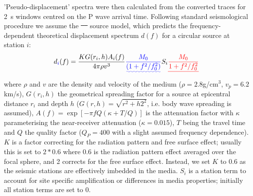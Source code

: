 \documentclass[reviewcopy]{elsart}
\providecommand{\DIFadd}[1]{{\protect\color{blue}\uwave{#1}}} %
\providecommand{\DIFdel}[1]{{\protect\color{red}\sout{#1}}}                      %
\providecommand{\DIFaddbegin}{} %
\providecommand{\DIFaddend}{} %
\providecommand{\DIFdelbegin}{} %
\providecommand{\DIFdelend}{} %
\begin{document}
'Pseudo-displacement' spectra were then calculated from the converted traces for 2~s windows
centred on the P wave arrival time.  Following standard seismological
procedure we assume the \DIFdelbegin \DIFdel{\mbox{%
\citep{brune70} }%
}\DIFdelend \DIFaddbegin \DIFadd{\mbox{%
\citet{brune70} }%
}\DIFaddend source model, which predicts
the frequency-dependent theoretical displacement spectrum $d(f)$ for a circular source at
station $i$:
\begin{equation}
d\DIFaddbegin \DIFadd{_i}\DIFaddend (f)=\frac{K G(r_i,h) A_i(f)}{4 \pi \rho v^3} \DIFaddbegin \DIFadd{\frac{M_0}{(1+f^2/f_0^2)}  }\DIFaddend S_i
\DIFdelbegin \DIFdel{\frac{M_0}{1+f^2/f_0^2} 
}\DIFdelend \end{equation}
where $\rho$ and $v$ are the density and velocity of the medium
($\rho=2.8$g/cm$^3$, $v_p=6.2$km/s), $G(r_i,h)$ the geometrical 
spreading factor for a source at epicentral distance $r_i$ and depth
$h$ (\DIFdelbegin \DIFdel{$G(r,h)=\sqrt{r^2+h2^2}$}\DIFdelend \DIFaddbegin \DIFadd{$G(r_i,h)=\sqrt{r_i^2+h^2}$}\DIFaddend , i.e. body wave spreading is assumed),
\DIFdelbegin \DIFdel{$A(f)=\exp[-\pi f Q (\kappa + T / Q)]$ }\DIFdelend \DIFaddbegin \DIFadd{$A(f)=\exp[-\pi f Q (\kappa + T_i / Q)]$ }\DIFaddend is the attenuation factor with 
$\kappa$ parameterising the near-receiver attenuation ($\kappa=0.015$),
\DIFdelbegin \DIFdel{$T$ }\DIFdelend \DIFaddbegin \DIFadd{$T_i$ }\DIFaddend being the travel time and $Q$ the quality factor ($Q_P=400$ with a
slight assumed frequency dependence). $K$ is a factor correcting for the
radiation pattern and free surface effect; usually this is set to
$2*0.6$ where 0.6 is the radiation pattern effect averaged over the
focal sphere, and 2 corrects for the free surface effect.  Instead, we
set $K$ to 0.6 as the seismic stations are effectively imbedded in the
media.  $S_i$ is a station term to account for site specific
amplification or differences in media properties; initially all
station terms are set to 0. 
\end{document}
